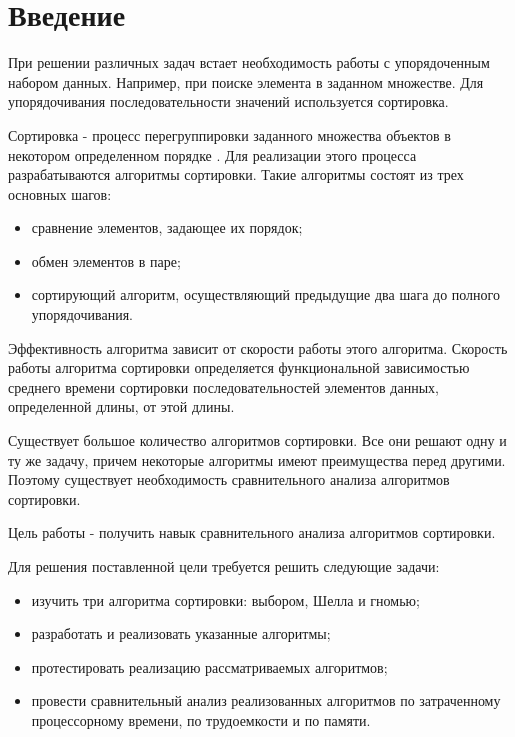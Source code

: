 \chapter*{Введение}

При решении различных задач встает необходимость работы с упорядоченным набором данных. Например, при поиске элемента в заданном множестве. Для упорядочивания последовательности значений используется сортировка.

Сортировка - процесс перегруппировки заданного множества объектов в некотором определенном порядке \cite{virt}. Для реализации этого процесса разрабатываются алгоритмы сортировки. Такие алгоритмы состоят из трех основных шагов: 

\begin{itemize}
	\item сравнение элементов, задающее их порядок;
	\item обмен элементов в паре;
	\item сортирующий алгоритм, осуществляющий предыдущие два шага до полного упорядочивания.
\end{itemize}

Эффективность алгоритма зависит от скорости работы этого алгоритма. Скорость работы алгоритма сортировки определяется функциональной зависимостью среднего времени сортировки последовательностей элементов
данных, определенной длины, от этой длины.

Существует большое количество алгоритмов сортировки. Все они решают одну и ту же задачу, причем некоторые алгоритмы имеют преимущества перед другими. Поэтому существует необходимость сравнительного анализа алгоритмов сортировки. 

Цель работы - получить навык сравнительного анализа алгоритмов сортировки.

Для решения поставленной цели требуется решить следующие задачи:

\begin{itemize}
	\item изучить три алгоритма сортировки: выбором, Шелла и гномью;
	\item разработать и реализовать указанные алгоритмы;
	\item протестировать реализацию рассматриваемых алгоритмов;
	\item провести сравнительный анализ реализованных алгоритмов по затраченному процессорному времени, по трудоемкости и по памяти.
\end{itemize}